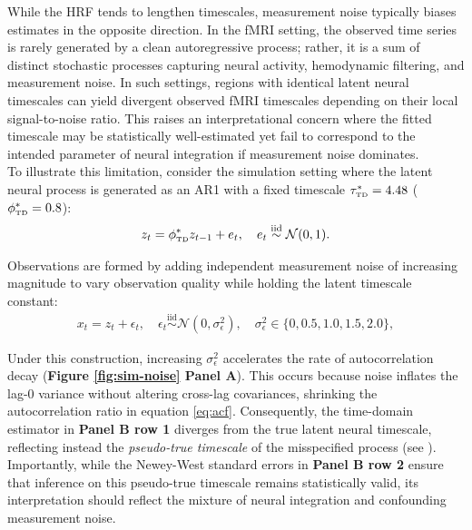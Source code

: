 \documentclass[docs/main.tex]{subfiles}
\begin{document}
While the HRF tends to lengthen timescales, measurement noise typically biases estimates in the opposite direction. In the fMRI setting, the observed time series is rarely generated by a clean autoregressive process; rather, it is a sum of distinct stochastic processes capturing neural activity, hemodynamic filtering, and measurement noise. In such settings, regions with identical latent neural timescales can yield divergent observed fMRI timescales depending on their local signal-to-noise ratio. This raises an interpretational concern where the fitted timescale may be statistically well-estimated yet fail to correspond to the intended parameter of neural integration if measurement noise dominates. \\

To illustrate this limitation, consider the simulation setting where the latent neural process is generated as an AR1 with a fixed timescale $\tau_{\scriptscriptstyle\text{TD}}^* = 4.48$ ($\phi_{\scriptscriptstyle\text{TD}}^* = 0.8$):
\begin{align}
    z_t = \phi_{\scriptscriptstyle\text{TD}}^* z_{t-1} + e_t, \quad e_t \overset{\text{iid}}{\sim} \mathcal{N}(0, 1).
\end{align}

\noindent Observations are formed by adding independent measurement noise of increasing magnitude to vary observation quality while holding the latent timescale constant:
\begin{align}\label{eq:measurement-noise}
    x_t = z_t + \epsilon_t, \quad \epsilon_t \overset{\text{iid}}{\sim} \mathcal{N}(0, \sigma^2_{\epsilon}), \quad \sigma^2_{\epsilon} \in \{0, 0.5, 1.0, 1.5, 2.0\},
\end{align}

\noindent Under this construction, increasing $\sigma^2_\epsilon$ accelerates the rate of autocorrelation decay (\textbf{Figure \ref{fig:sim-noise} Panel A}). This occurs because noise inflates the lag-0 variance without altering cross-lag covariances, shrinking the autocorrelation ratio in equation \eqref{eq:acf}. Consequently, the time-domain estimator in \textbf{Panel B row 1} diverges from the true latent neural timescale, reflecting instead the \textit{pseudo-true timescale} of the misspecified process (see ). Importantly, while the Newey-West standard errors in \textbf{Panel B row 2} ensure that inference on this pseudo-true timescale remains statistically valid, its interpretation should reflect the mixture of neural integration and confounding measurement noise.\\
\end{document}
